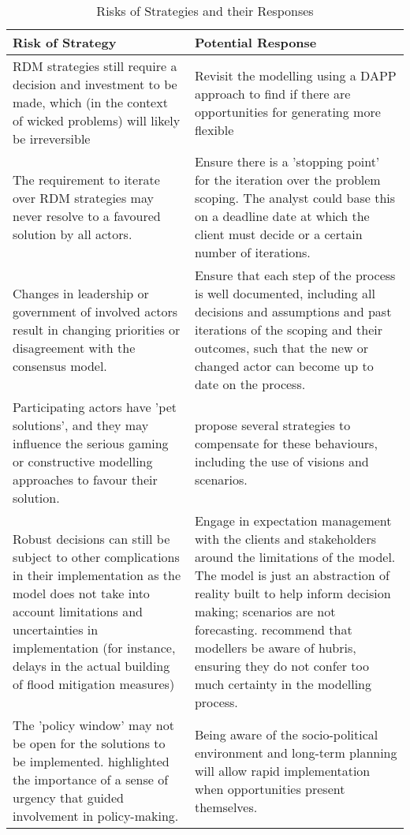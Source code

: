 \begin{table}[h!]
\caption{Risks of Strategies and their Responses}
\label{tab:pr-risks-and-responses}
\centering
\begin{tabular}{p{}|p{}}
\hline
Risk of Strategy &
  Potential Response \\ \hline
RDM strategies still require a decision and investment to be made, which (in the context of wicked problems) will likely be irreversible &
  Revisit the modelling using a DAPP approach to find if there are opportunities for generating more flexible \\ \hline
The requirement to iterate over RDM strategies may never resolve to a favoured solution by all actors. &
  Ensure there is a 'stopping point' for the iteration over the problem scoping. The analyst could base this on a deadline date at which the client must decide or a certain number of iterations. \\ \hline
Changes in leadership or government of involved actors result in changing priorities or disagreement with the consensus model. &
  Ensure that each step of the process is well documented, including all decisions and assumptions and past iterations of the scoping and their outcomes, such that the new or changed actor can become up to date on the process. \\ \hline
Participating actors have 'pet solutions', and they may influence the serious gaming or constructive modelling approaches to favour their solution. &
  \citeauthor{pot_what_2018} propose several strategies to compensate for these behaviours, including the use of visions and scenarios. \\ \hline
Robust decisions can still be subject to other complications in their implementation as the model does not take into account limitations and uncertainties in implementation (for instance, delays in the actual building of flood mitigation measures) &
  Engage in expectation management with the clients and stakeholders around the limitations of the model. The model is just an abstraction of reality built to help inform decision making; scenarios are not forecasting. \cite{saltelli_five_2020} recommend that modellers be aware of hubris, ensuring they do not confer too much certainty in the modelling process. \\ \hline
The 'policy window' may not be open for the solutions to be implemented. \cite{rijke_room_2012} highlighted the importance of a sense of urgency that guided involvement in policy-making. & Being aware of the socio-political environment and long-term planning will allow rapid implementation when opportunities present themselves.

\end{tabular}
\end{table}
